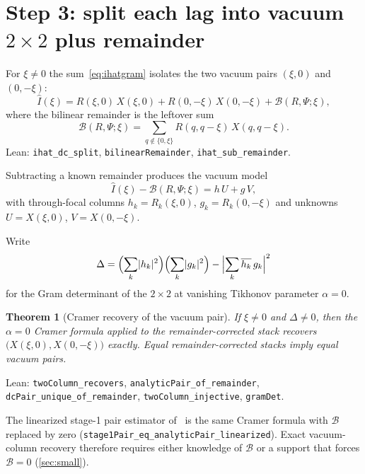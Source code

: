 \documentclass[11pt,a4paper]{article}
\newtheorem{theorem}{Theorem}[section]
\theoremstyle{definition}
\theoremstyle{remark}
\newcommand{\conj}[1]{\overline{#1}}
\newcommand{\abs}[1]{\lvert#1\rvert}
\begin{document}
\section{Step 3: split each lag into vacuum $2\times 2$ plus remainder}
\label{sec:split}

For $\xi\neq 0$ the sum~\eqref{eq:ihatgram} isolates the two vacuum
pairs $(\xi,0)$ and $(0,-\xi)$:
\begin{equation}
\label{eq:split}
\hat I(\xi)
=R(\xi,0)\,X(\xi,0)
+R(0,-\xi)\,X(0,-\xi)
+\mathcal{B}(R,\Psi;\xi),
\end{equation}
where the bilinear remainder is the leftover sum
\begin{equation}
\label{eq:B}
\mathcal{B}(R,\Psi;\xi)
=\sum_{q\notin\{0,\xi\}}
R(q,q-\xi)\,X(q,q-\xi).
\end{equation}
Lean: \texttt{ihat\_dc\_split}, \texttt{bilinearRemainder},
\texttt{ihat\_sub\_remainder}.

Subtracting a known remainder produces the vacuum model
\begin{equation}
\label{eq:twocol}
\hat I(\xi)-\mathcal{B}(R,\Psi;\xi)
=h\,U+g\,V,
\end{equation}
with through-focal columns $h_k=R_k(\xi,0)$,
$g_k=R_k(0,-\xi)$ and unknowns
$U=X(\xi,0)$, $V=X(0,-\xi)$.

Write
\begin{equation}
\label{eq:gramdet}
\Delta
=\Bigl(\sum_k\abs{h_k}^2\Bigr)
 \Bigl(\sum_k\abs{g_k}^2\Bigr)
-\Bigl\lvert\sum_k\conj{h_k}\,g_k\Bigr\rvert^2
\end{equation}
for the Gram determinant of the $2\times 2$ at vanishing Tikhonov
parameter $\alpha=0$.

\begin{theorem}[Cramer recovery of the vacuum pair]
\label{thm:cramer}
If $\xi\neq 0$ and $\Delta\neq 0$, then the $\alpha=0$ Cramer formula
applied to the remainder-corrected stack recovers
$\bigl(X(\xi,0),X(0,-\xi)\bigr)$ exactly.
Equal remainder-corrected stacks imply equal vacuum pairs.
\end{theorem}
Lean: \texttt{twoColumn\_recovers},
\texttt{analyticPair\_of\_remainder},
\texttt{dcPair\_unique\_of\_remainder},
\texttt{twoColumn\_injective}, \texttt{gramDet}.

The linearized stage-1 pair estimator of~\cite{Lau2026inverse} is the
same Cramer formula with $\mathcal{B}$ replaced by zero
(\texttt{stage1Pair\_eq\_analyticPair\_linearized}).
Exact vacuum-column recovery therefore requires either knowledge of
$\mathcal{B}$ or a support that forces $\mathcal{B}=0$
(\cref{sec:small}).
\end{document}
